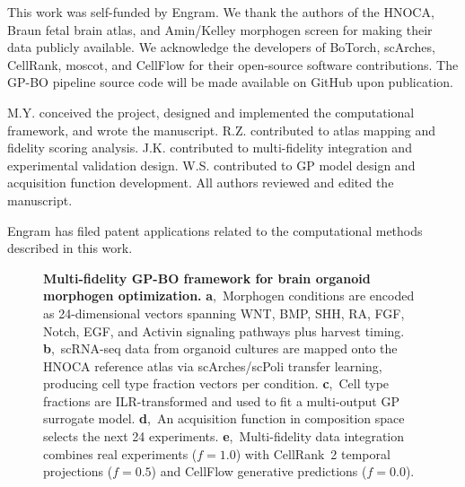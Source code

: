 \documentclass[times,twoside]{zHenriquesLab-StyleBioRxiv}
\begin{document}

\begin{acknowledgements}
This work was self-funded by Engram. We thank the authors of the HNOCA, Braun fetal brain atlas, and Amin/Kelley morphogen screen for making their data publicly available. We acknowledge the developers of BoTorch, scArches, CellRank, moscot, and CellFlow for their open-source software contributions. The GP-BO pipeline source code will be made available on GitHub upon publication.
\end{acknowledgements}

\begin{contributions}
M.Y. conceived the project, designed and implemented the computational framework, and wrote the manuscript. R.Z. contributed to atlas mapping and fidelity scoring analysis. J.K. contributed to multi-fidelity integration and experimental validation design. W.S. contributed to GP model design and acquisition function development. All authors reviewed and edited the manuscript.
\end{contributions}

\begin{interests}
Engram has filed patent applications related to the computational methods described in this work.
\end{interests}




\begin{figure}[tbp]
\centering
{}
\caption{\textbf{Multi-fidelity GP-BO framework for brain organoid morphogen optimization.}
\textbf{a},~Morphogen conditions are encoded as 24-dimensional vectors spanning WNT, BMP, SHH, RA, FGF, Notch, EGF, and Activin signaling pathways plus harvest timing.
\textbf{b},~scRNA-seq data from organoid cultures are mapped onto the HNOCA reference atlas via scArches/scPoli transfer learning, producing cell type fraction vectors per condition.
\textbf{c},~Cell type fractions are ILR-transformed and used to fit a multi-output GP surrogate model.
\textbf{d},~An acquisition function in composition space selects the next 24 experiments.
\textbf{e},~Multi-fidelity data integration combines real experiments ($f{=}1.0$) with CellRank~2 temporal projections ($f{=}0.5$) and CellFlow generative predictions ($f{=}0.0$).}
\label{fig:overview}
\end{figure}
\end{document}

